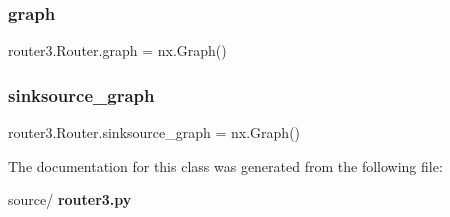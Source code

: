 \mbox{\label{classrouter3_1_1_router_a15e4b664994bd0840db3979ae4408bc6}} 
\subsubsection{graph}
{\footnotesize\ttfamily router3.\+Router.\+graph = nx.\+Graph()\hspace{0.3cm}{\ttfamily [static]}}

\mbox{\label{classrouter3_1_1_router_a47501237c7094a9375f03c16927818de}} 
\subsubsection{sinksource\+\_\+graph}
{\footnotesize\ttfamily router3.\+Router.\+sinksource\+\_\+graph = nx.\+Graph()\hspace{0.3cm}{\ttfamily [static]}}



The documentation for this class was generated from the following file\+:\begin{DoxyCompactItemize}
\item 
source/\textbf{ router3.\+py}\end{DoxyCompactItemize}
